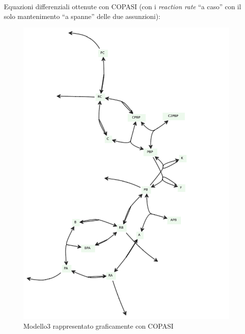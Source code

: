 \documentclass{article}
\begin{document}
Equazioni differenziali ottenute con COPASI (con i \textit{reaction rate} ``a
caso'' con il solo mantenimento ``a spanne'' delle due assunzioni):
\scriptsize{
  
}
\newpage
\noindent
\begin{figure}[H]
  \centering
  \includegraphics[width = \textwidth]{img/model.pdf}
  \caption{Modello3 rappresentato graficamente con COPASI}
  \label{fig:model3}
\end{figure}
\end{document}
